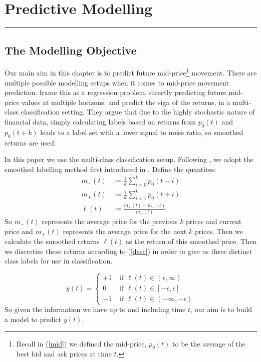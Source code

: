 \chapter{Predictive Modelling}
\hrule
\vspace{40pt}


\section{The Modelling Objective}

Our main aim in this chapter is to predict future mid-price\footnote{Recall in (\ref{mid}) we defined the mid-price, $p_0(t)$ to be the average of the best bid and ask prices at time $t$.}
movement. 
There are multiple possible modelling setups when it comes to mid-price movement prediction.
\cite{KOLM2023} frame this as a regression problem, directly predicting future mid-price values at multiple horizons.
\cite{ZHANG2019} and \cite{LUCCHESE2024} predict the sign of the returns, in a multi-class classification setting.
They argue that due to the highly stochastic nature of financial data, simply calculating labels based on returns from $p_{0}(t)$ and $p_{0}(t+k)$ 
leads to a label set with a lower signal to noise ratio, so smoothed returns are used.

In this paper we use the multi-class classification setup.
Following \cite{ZHANG2019}, we adopt the smoothed labelling method first introduced in \cite{AVRAAM2017}. Define the quantites:
\begin{align}
    m_{-}(t) &:= \frac{1}{k} \sum_{i=0}^{k} p_0(t-i) \\
    m_{+}(t) &:= \frac{1}{k} \sum_{i=1}^{k} p_0(t+i) \\
    \ell(t) &:= \frac{m_{+}(t) - m_{-}(t)}{m_{-}(t)}
    \label{smoothed_returns}
\end{align}
So $m_{-}(t)$ represents the average price for the previous $k$ prices and current price
and $m_{+}(t)$ represents the average price for the next $k$ prices.
Then we calculate the smoothed returns $\ell(t)$ as the return of this smoothed price. 
Then we discretize these returns according to (\ref{desc}) in order to give us three distinct class labels for use in classification.

\begin{equation}
    y(t) = \begin{cases} \label{desc}
        +1  & \text{ if } \ell(t) \in (\epsilon, \infty) \\
        0  & \text{ if } \ell(t) \in [-\epsilon, \epsilon] \\
       -1  & \text{ if } \ell(t) \in  (-\infty, -\epsilon)
   \end{cases}
\end{equation}
So given the information we have up to and including time $t$, our aim is to build a model to predict $y(t)$.

